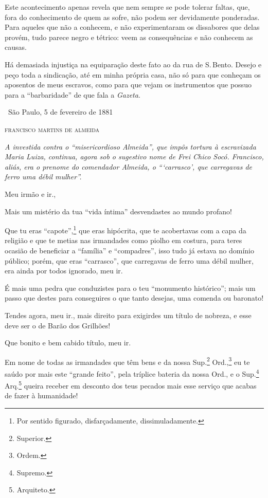 Este acontecimento apenas revela que nem sempre se pode tolerar faltas,
que, fora do conhecimento de quem as sofre, não podem ser devidamente
ponderadas. Para aqueles que não a conhecem, e não experimentaram os
dissabores que delas provém, tudo parece negro e tétrico: veem as
consequências e não conhecem as causas.

Há demasiada injustiça na equiparação deste fato ao da rua de S.\,Bento.
Desejo e peço toda a sindicação, até em minha própria casa, não só para
que conheçam os aposentos de meus escravos, como para que vejam os
instrumentos que possuo para a ``barbaridade'' de que fala a
\emph{Gazeta}.

\medskip
\hfill\ São Paulo, 5 de fevereiro de 1881

\hfill\textsc{francisco martins de almeida}


\begin{resumo}
\emph{A investida contra o ``misericordioso Almeida'', que impôs tortura à
escravizada Maria Luiza, continua, agora sob o sugestivo nome de Frei
Chico Socó. Francisco, aliás, era o prenome do comendador Almeida,
o ```carrasco', que carregavas de ferro uma débil mulher''.}
\end{resumo}

Meu irmão e ir., %

Mais um mistério da tua ``vida íntima'' desvendastes ao mundo profano!

Que tu eras ``capote'',\footnote{Por sentido figurado, disfarçadamente,
  dissimuladamente.} que eras hipócrita, que te acobertavas com a capa
da religião e que te metias nas irmandades como piolho em costura, para
teres ocasião de beneficiar a ``família'' e ``compadres'', isso tudo já
estava no domínio público; porém, que eras ``carrasco'', que carregavas de
ferro uma débil mulher, era ainda por todos ignorado, meu ir.

É mais uma pedra que conduzistes para o teu ``monumento histórico''; mais
um passo que destes para conseguires o que tanto desejas, uma comenda ou
baronato!

Tendes agora, meu ir., mais direito para exigirdes um título de
nobreza, e esse deve ser o de Barão dos Grilhões!

Que bonito e bem cabido título, meu ir.

Em nome de todas as irmandades que têm bens e da nossa Sup.\footnote{
  Superior.} Ord.,\footnote{Ordem.} eu te saúdo por mais este ``grande
feito'', pela tríplice bateria da nossa Ord., e o Sup.\footnote{
  Supremo.} Arq.\footnote{Arquiteto.}
queira receber em desconto
dos teus pecados mais esse serviço que acabas de fazer à humanidade!

